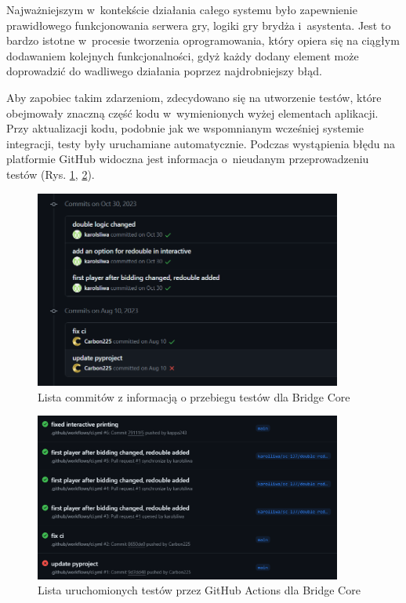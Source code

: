 Najważniejszym w~kontekście działania całego systemu
było zapewnienie prawidłowego funkcjonowania
serwera gry, logiki gry brydża i~asystenta.
Jest to bardzo istotne w~procesie tworzenia oprogramowania,
który opiera się na ciągłym dodawaniem kolejnych
funkcjonalności, gdyż każdy dodany element może doprowadzić
do wadliwego działania poprzez najdrobniejszy błąd.

Aby zapobiec takim zdarzeniom, zdecydowano się na utworzenie
testów, które obejmowały znaczną część kodu w~wymienionych
wyżej elementach aplikacji. Przy aktualizacji kodu,
podobnie jak we wspomnianym wcześniej systemie integracji,
testy były uruchamiane automatycznie. Podczas wystąpienia
błędu na platformie GitHub widoczna jest informacja
o~nieudanym przeprowadzeniu testów
(Rys. \ref{fig:github-commits}, \ref{fig:github-tests}).

\begin{figure}[hbt!]
    \centering
    \includegraphics[width=0.9\textwidth]{img/github/github-commits.png}
    \caption{Lista commitów z informacją o przebiegu testów dla Bridge Core}
    \label{fig:github-commits}
\end{figure}

\begin{figure}[hbt!]
    \centering
    \includegraphics[width=0.9\textwidth]{img/github/github-tests.png}
    \caption{Lista uruchomionych testów przez GitHub Actions dla Bridge Core}
    \label{fig:github-tests}
\end{figure}


